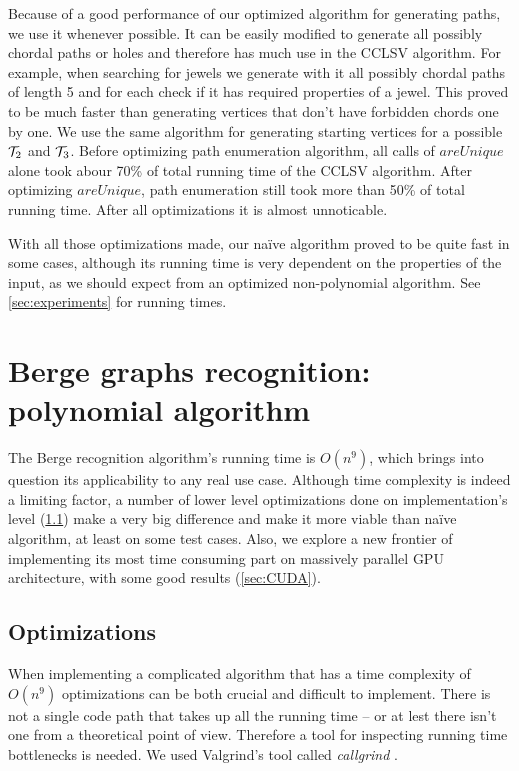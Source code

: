 Because of a good performance of our optimized algorithm for generating paths, we use it whenever possible. It can be easily modified to generate all possibly chordal paths or holes and therefore has much use in the CCLSV algorithm. For example, when searching for jewels we generate with it all possibly chordal paths of length 5 and for each check if it has required properties of a jewel. This proved to be much faster than generating vertices that don't have forbidden chords one by one. We use the same algorithm for generating starting vertices for a possible $\mathcal{T}_2$ and $\mathcal{T}_3$. Before optimizing path enumeration algorithm, all calls of $areUnique$ alone took abour 70\% of total running time of the CCLSV algorithm. After optimizing $areUnique$, path enumeration still took more than 50\% of total running time. After all optimizations it is almost unnoticable.

With all those optimizations made, our na\"ive algorithm proved to be quite fast in some cases, although its running time is very dependent on the properties of the input, as we should expect from an optimized non-polynomial algorithm. See \cref{sec:experiments} for running times.

\section{Berge graphs recognition: polynomial algorithm}


The Berge recognition algorithm's running time is $O(n^9)$, which brings into question its applicability to any real use case. Although time complexity is indeed a limiting factor, a number of lower level optimizations done on implementation's level (\cref{sec:Optimizations}) make a very big difference and make it more viable than na\"ive algorithm, at least on some test cases. Also, we explore a new frontier of implementing its most time consuming part on massively parallel GPU architecture, with some good results (\cref{sec:CUDA}).


\subsection{Optimizations}
\label{sec:Optimizations}

When implementing a complicated algorithm that has a time complexity of $O(n^9)$ optimizations can be both crucial and difficult to implement. There is not a single code path that takes up all the running time -- or at lest there isn't one from a theoretical point of view. Therefore a tool for inspecting running time bottlenecks is needed. We used Valgrind's tool called \emph{callgrind} \cite{callgrind}.

